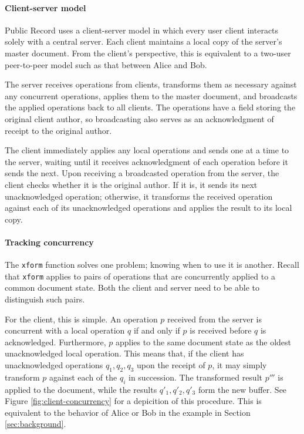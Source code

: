 \documentclass[letterpaper,11pt,twocolumn]{article}
\newcommand{\code}[1]{\texttt{\small #1}}
\begin{document}
\newcommand{\operation}{\texttt{Operation}}
\paragraph*{Client-server model}
Public Record uses a client-server model in which every user client interacts solely with a central server.  Each client maintains a local copy of the server's master document.  From the client's perspective, this is equivalent to a two-user peer-to-peer model such as that between Alice and Bob.

The server receives operations from clients, transforms them as necessary against any concurrent operations, applies them to the master document, and broadcasts the applied operations back to all clients.  The operations have a field storing the original client author, so broadcasting also serves as an acknowledgment of receipt to the original author.

The client immediately applies any local operations and sends one at a time to the server, waiting until it receives acknowledgment of each operation before it sends the next.  Upon receiving a broadcasted operation from the server, the client checks whether it is the original author.  If it is, it sends its next unacknowledged operation; otherwise, it transforms the received operation against each of its unacknowledged operations and applies the result to its local copy. 

\paragraph*{Tracking concurrency}
The \code{xform} function solves one problem; knowing when to use it is another.  Recall that \code{xform} applies to pairs of operations that are concurrently applied to a common document state.  Both the client and server need to be able to distinguish such pairs.

For the client, this is simple.  An operation $p$ received from the server is concurrent with a local operation $q$ if and only if $p$ is received before $q$ is acknowledged.  Furthermore, $p$ applies to the same document state as the oldest unacknowledged local operation.  This means that, if the client has unacknowledged operations $q_1,q_2,q_3$ upon the receipt of $p$, it may simply transform $p$ against each of the $q_i$ in succession.  The transformed result $p'''$ is applied to the document, while the results $q'_1,q'_2,q'_3$ form the new buffer.  See Figure \ref{fig:client-concurrency} for a depicition of this procedure.  This is equivalent to the behavior of Alice or Bob in the example in Section \ref{sec:background}.
\end{document}
